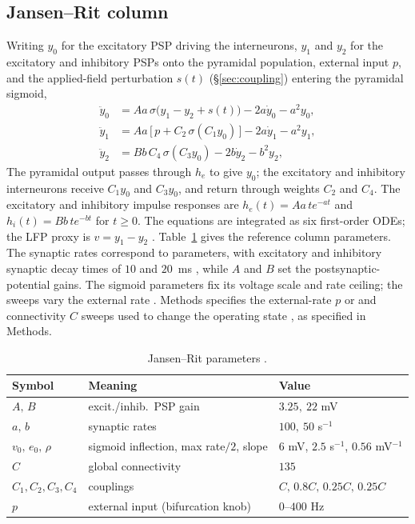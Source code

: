 \documentclass[11pt,a4paper]{article}
\newcommand{\Sig}{\sigma}
\providecommand{\DIFaddtex}[1]{{\protect\color{blue} \sf #1}} %
\providecommand{\DIFdeltex}[1]{{\protect\color{red} \scriptsize #1}} %
\providecommand{\DIFaddbegin}{} %
\providecommand{\DIFaddend}{} %
\providecommand{\DIFdelbegin}{} %
\providecommand{\DIFdelend}{} %
\providecommand{\DIFadd}[1]{\texorpdfstring{\DIFaddtex{#1}}{#1}} %
\providecommand{\DIFdel}[1]{\texorpdfstring{\DIFdeltex{#1}}{}} %
\begin{document}
\DIFdelend \subsection*{Jansen--Rit column}
Writing $y_0$ for the excitatory PSP driving the interneurons, $y_1$ and $y_2$ for the
excitatory and inhibitory PSPs onto the pyramidal population, external input $p$, and the
applied-field perturbation $s(t)$ (\S\ref{sec:coupling}) entering the pyramidal sigmoid,
\begin{align}
\ddot y_0 &= Aa\,\Sig\!\big(y_1-y_2+s(t)\big)-2a\dot y_0-a^2 y_0, \label{eq:jr0}\\
\ddot y_1 &= Aa\,\big[\,p+C_2\,\Sig(C_1 y_0)\,\big]-2a\dot y_1-a^2 y_1,\\
\ddot y_2 &= Bb\,C_4\,\Sig(C_3 y_0)-2b\dot y_2-b^2 y_2,
\end{align}
The pyramidal output passes through $h_e$ to give $y_0$; the excitatory
and inhibitory interneurons receive $C_1y_0$ and $C_3y_0$, and return through
weights $C_2$ and $C_4$. The excitatory and inhibitory impulse responses are
$h_e(t)=Aa\,t e^{-at}$ and $h_i(t)=Bb\,t e^{-bt}$ for $t\ge0$.
The equations are integrated as six first-order ODEs; the LFP proxy is $v=y_1-y_2$ \cite{jansen1995}.
Table~\ref{tab:params} gives the reference \DIFdelbegin \DIFdel{column parameters. The synaptic rates
correspond to }\DIFdelend \DIFaddbegin \DIFadd{parameters, with }\DIFaddend excitatory and
inhibitory \DIFaddbegin \DIFadd{synaptic }\DIFaddend decay times of $10$ and $20$~ms\DIFdelbegin \DIFdel{, while
$A$ and $B$ set the postsynaptic-potential gains. The sigmoid parameters fix its
voltage scale and rate ceiling; the
sweeps vary the external rate }\DIFdelend \DIFaddbegin \DIFadd{. Methods specifies the
external-rate }\DIFaddend $p$ \DIFdelbegin \DIFdel{or }\DIFdelend \DIFaddbegin \DIFadd{and }\DIFaddend connectivity $C$ \DIFaddbegin \DIFadd{sweeps used }\DIFaddend to change the operating state\DIFdelbegin \DIFdel{, as specified in Methods}\DIFdelend .

\begin{table}[h]\centering\small
\caption{Jansen--Rit parameters \cite{jansen1995}.}
\label{tab:params}
\begin{tabular}{@{}lll@{}}
\toprule
Symbol & Meaning & Value\\
\midrule
$A,\,B$ & excit./inhib.\ PSP gain & $3.25,\ 22$ mV\\
$a,\,b$ & synaptic rates & $100,\ 50$ s$^{-1}$\\
$v_0,\,e_0,\,\rho$ & sigmoid inflection, max rate$/2$, slope & $6$ mV, $2.5$ s$^{-1}$, $0.56$ mV$^{-1}$\\
$C$ & global connectivity & $135$\\
$C_1,C_2,C_3,C_4$ & couplings & $C,\,0.8C,\,0.25C,\,0.25C$\\
$p$ & external input (bifurcation knob) & $0$--$400$ Hz\\
\bottomrule
\end{tabular}
\end{table}
\end{document}
